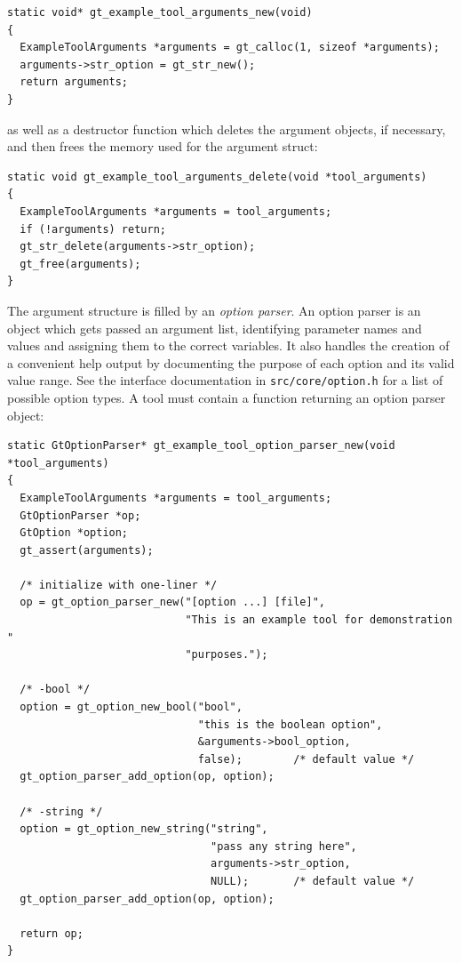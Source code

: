\documentclass[11pt,final]{article}
\newcommand{\keyword}[1]{\lstinline{#1}}
\begin{document}
\begin{lstlisting}
static void* gt_example_tool_arguments_new(void)
{
  ExampleToolArguments *arguments = gt_calloc(1, sizeof *arguments);
  arguments->str_option = gt_str_new();
  return arguments;
}
\end{lstlisting}

as well as a destructor function which deletes the argument objects, if
necessary, and then frees the memory used for the argument struct:

\begin{lstlisting}
static void gt_example_tool_arguments_delete(void *tool_arguments)
{
  ExampleToolArguments *arguments = tool_arguments;
  if (!arguments) return;
  gt_str_delete(arguments->str_option);
  gt_free(arguments);
}
\end{lstlisting}

The argument structure is filled by an \emph{option parser}. An option parser
is an object which gets passed an argument list, identifying parameter names
and values and assigning them to the correct variables. It also handles
the creation of a convenient help output by documenting the purpose of each
option and its valid value range. See the interface documentation in
\keyword{src/core/option.h} for a list of possible option types.
A tool must contain a function returning an option parser object:

\begin{lstlisting}
static GtOptionParser* gt_example_tool_option_parser_new(void *tool_arguments)
{
  ExampleToolArguments *arguments = tool_arguments;
  GtOptionParser *op;
  GtOption *option;
  gt_assert(arguments);

  /* initialize with one-liner */
  op = gt_option_parser_new("[option ...] [file]",
                            "This is an example tool for demonstration "
                            "purposes.");

  /* -bool */
  option = gt_option_new_bool("bool",
                              "this is the boolean option",
                              &arguments->bool_option,
                              false);        /* default value */
  gt_option_parser_add_option(op, option);

  /* -string */
  option = gt_option_new_string("string",
                                "pass any string here",
                                arguments->str_option,
                                NULL);       /* default value */
  gt_option_parser_add_option(op, option);

  return op;
}
\end{lstlisting}
\end{document}
